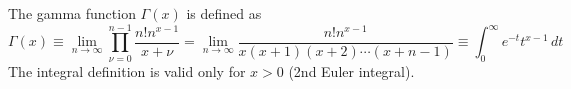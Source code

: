 \documentclass{article}
\begin{document}
\noindent
The gamma function $\Gamma(x)$ is defined as
\[ \Gamma(x)\equiv\lim_{n\to\infty}\prod_{\nu=0}^{n-1}\frac{n!n^{x-1}}{x+\nu}
	    = \lim_{n\to\infty}\frac{n!n^{x-1}}{x(x+1)(x+2)\cdots(x+n-1)}
	    \equiv\int_0^\infty e^{-t}t^{x-1}\,dt \]
The integral definition is valid only for $x>0$ (2nd Euler integral).
\end{document}
